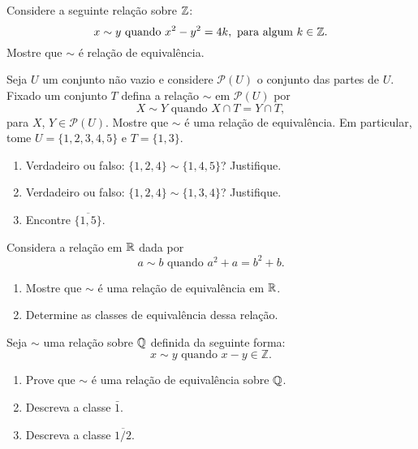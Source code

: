 \documentclass[12pt]{exam}
\begin{document}
    \vspace{.3cm}

    \questao{} Considere a seguinte rela\c{c}\~ao sobre $\mathbb{Z}$:
    \[
        x \sim y \mbox{ quando }  x^2 - y^2 = 4k, \mbox{ para algum } k \in \mathbb{Z}.
    \]
    Mostre que $\sim$ {\'e} rela{\c c}{\~a}o de equival{\^e}ncia.

    \vspace{.3cm}

    \questao{} Seja $U$ um conjunto não vazio e considere $\mathcal{P}(U)$ o conjunto das partes de $U$. Fixado um conjunto $T$ defina a relação $\sim$ em $\mathcal{P}(U)$ por
    \[
        X \sim Y \mbox{ quando } X \cap T = Y \cap T,
    \]
    para $X$, $Y \in \mathcal{P}(U)$. Mostre que $\sim$ é uma relação de equivalência. Em particular, tome $U = \{1,2,3,4,5\}$ e $T = \{1,3\}$.
    \begin{enumerate}[label={\alph*})]
        \item Verdadeiro ou falso: $\{1,2,4\} \sim \{1,4,5\}$? Justifique.

        \item Verdadeiro ou falso: $\{1,2,4\} \sim \{1,3,4\}$? Justifique.

        \item Encontre $\overline{\{1,5\}}$.

    \end{enumerate}

    \vspace{.3cm}

    \questao{} Considera a rela\c{c}\~ao em $\mathbb{R}$ dada por
    \[
        a \sim b \mbox{ quando } a^2 + a = b^2 + b.
    \]
    \begin{enumerate}[label={\alph*})]
        \item Mostre que $\sim$ \'e uma rela\c{c}\~ao de equival\^encia em $\mathbb{R}$.

        \item Determine as classes de equival\^encia dessa rela\c{c}\~ao.
    \end{enumerate}

    \vspace{.3cm}

    \questao{} Seja $\sim$ uma rela{\c c}{\~a}o sobre $\mathbb{Q}$ definida da seguinte forma:
    \[
        x \sim y \mbox{ quando } x - y \in \mathbb{Z}.
    \]
    \begin{enumerate}[label={\alph*})]
        \item Prove que $\sim$ {\'e} uma rela{\c c}{\~a}o de equival{\^e}ncia sobre $\mathbb{Q}$.

        \item Descreva a classe $\bar{1}$.

        \item Descreva a classe $\overline{1/2}$.
    \end{enumerate}
\end{document}
